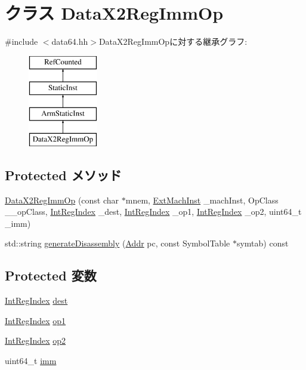 \hypertarget{classArmISA_1_1DataX2RegImmOp}{
\section{クラス DataX2RegImmOp}
\label{classArmISA_1_1DataX2RegImmOp}
}


{\ttfamily \#include $<$data64.hh$>$}DataX2RegImmOpに対する継承グラフ:\begin{figure}[H]
\begin{center}
\leavevmode
\includegraphics[height=4cm]{classArmISA_1_1DataX2RegImmOp}
\end{center}
\end{figure}
\subsection*{Protected メソッド}
\begin{DoxyCompactItemize}
\item 
\hyperlink{classArmISA_1_1DataX2RegImmOp_a30fe65daa8703b82b118a4b953ca5462}{DataX2RegImmOp} (const char $\ast$mnem, \hyperlink{classStaticInst_a5605d4fc727eae9e595325c90c0ec108}{ExtMachInst} \_\-machInst, OpClass \_\-\_\-opClass, \hyperlink{namespaceArmISA_ae64680ba9fb526106829d6bf92fc791b}{IntRegIndex} \_\-dest, \hyperlink{namespaceArmISA_ae64680ba9fb526106829d6bf92fc791b}{IntRegIndex} \_\-op1, \hyperlink{namespaceArmISA_ae64680ba9fb526106829d6bf92fc791b}{IntRegIndex} \_\-op2, uint64\_\-t \_\-imm)
\item 
std::string \hyperlink{classArmISA_1_1DataX2RegImmOp_a95d323a22a5f07e14d6b4c9385a91896}{generateDisassembly} (\hyperlink{classm5_1_1params_1_1Addr}{Addr} pc, const SymbolTable $\ast$symtab) const 
\end{DoxyCompactItemize}
\subsection*{Protected 変数}
\begin{DoxyCompactItemize}
\item 
\hyperlink{namespaceArmISA_ae64680ba9fb526106829d6bf92fc791b}{IntRegIndex} \hyperlink{classArmISA_1_1DataX2RegImmOp_aec72e8e45bdc87abeeeb75d2a8a9a716}{dest}
\item 
\hyperlink{namespaceArmISA_ae64680ba9fb526106829d6bf92fc791b}{IntRegIndex} \hyperlink{classArmISA_1_1DataX2RegImmOp_a4c465c43ad568f8bcf8ae71480e9cfea}{op1}
\item 
\hyperlink{namespaceArmISA_ae64680ba9fb526106829d6bf92fc791b}{IntRegIndex} \hyperlink{classArmISA_1_1DataX2RegImmOp_a7799ff6cbe5a252199059eb8665820e7}{op2}
\item 
uint64\_\-t \hyperlink{classArmISA_1_1DataX2RegImmOp_a2b4406ad2843b5aa12d244d01d8fdc69}{imm}
\end{DoxyCompactItemize}


